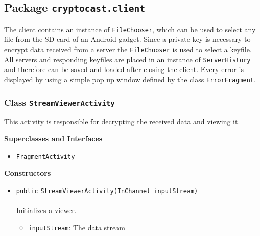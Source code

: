 \subsection{Package \lstinline!cryptocast.client!}
The client contains an instance of \lstinline|FileChooser|, which can be used to select any file from the SD card 
 of an Android gadget. Since a private key is necessary to encrypt data received from a server the 
 \lstinline|FileChooser| is used to select a keyfile. All servers and responding keyfiles are placed 
 in an instance of \lstinline|ServerHistory| and therefore can be saved and loaded after closing the client.
 Every error is displayed by using a simple pop up window defined by the class \lstinline|ErrorFragment|.

\subsubsection{Class \lstinline|StreamViewerActivity|}
This activity is responsible for decrypting the received data
 and viewing it. \\
\noindent\begin{minipage}[t]{5cm}
\vspace{0.3em}
\hspace*{2em}
\vspace{0.3em}
\end{minipage}



\textbf{\sffamily Superclasses and Interfaces}
\begin{itemize}
\item \lstinline|FragmentActivity|
\end{itemize}


\textbf{\sffamily Constructors}
\begin{itemize}
\item \lstinline|public| \lstinline|StreamViewerActivity|\lstinline|(InChannel inputStream)|\\ \\[-0.6em]
Initializes a viewer.
\begin{itemize}
\item \lstinline|inputStream|: The data stream
\end{itemize}



\end{itemize}


